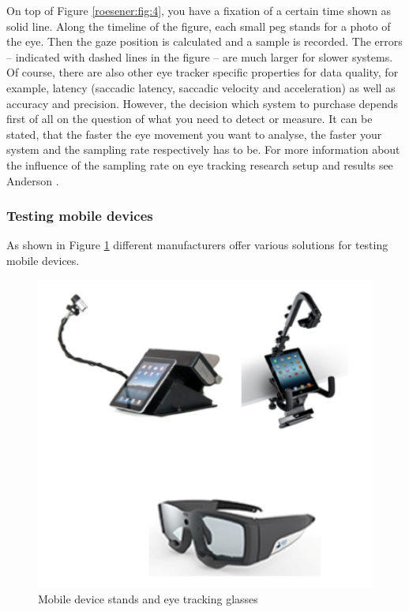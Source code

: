\documentclass[output=paper]{langsci/langscibook}
\begin{document}
On top of Figure \ref{roesener:fig:4}, you have a fixation of a certain time shown as solid line. Along the timeline of the figure, each small peg stands for a photo of the eye. Then the gaze position is calculated and a sample is recorded. The errors – indicated with dashed lines in the figure – are much larger for slower systems. Of course, there are also other eye tracker specific properties for data quality, for example, latency (saccadic latency, saccadic velocity and acceleration) as well as accuracy and precision. However, the decision which system to purchase depends first of all on the question of what you need to detect or measure. It can be stated, that the faster the eye movement you want to analyse, the faster your system and the sampling rate respectively has to be. For more information about the influence of the sampling rate on eye tracking research setup and results see Anderson \citep[c.f.][]{Andersson2009}. 

\subsubsection{Testing mobile devices}

As shown in Figure \ref{roesener:fig:5} different manufacturers offer various solutions for testing mobile devices. 

\begin{figure}
 \includegraphics[width=\textwidth]{figures/Roesener5.png}
 \caption{Mobile device stands and eye tracking glasses \citep{Tobii2014, SMI2014}}
 \label{roesener:fig:5}
\end{figure} 
\end{document}
